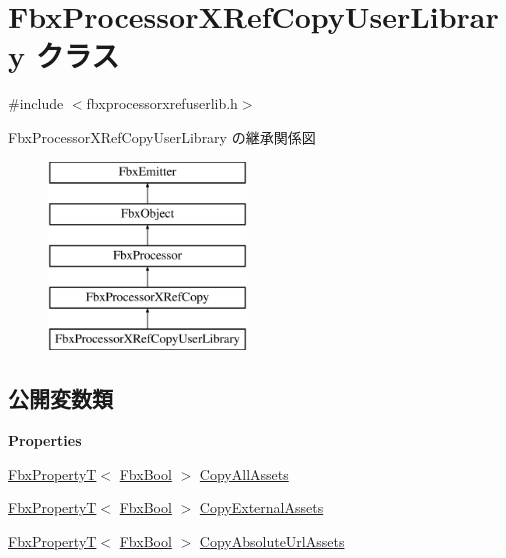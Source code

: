 \hypertarget{class_fbx_processor_x_ref_copy_user_library}{}\section{Fbx\+Processor\+X\+Ref\+Copy\+User\+Library クラス}
\label{class_fbx_processor_x_ref_copy_user_library}


{\ttfamily \#include $<$fbxprocessorxrefuserlib.\+h$>$}

Fbx\+Processor\+X\+Ref\+Copy\+User\+Library の継承関係図\begin{figure}[H]
\begin{center}
\leavevmode
\includegraphics[height=5.000000cm]{class_fbx_processor_x_ref_copy_user_library}
\end{center}
\end{figure}
\subsection*{公開変数類}
\begin{Indent}\textbf{ Properties}\par
\begin{DoxyCompactItemize}
\item 
\hyperlink{class_fbx_property_t}{Fbx\+PropertyT}$<$ \hyperlink{fbxtypes_8h_a92e0562b2fe33e76a242f498b362262e}{Fbx\+Bool} $>$ \hyperlink{class_fbx_processor_x_ref_copy_user_library_aa10de06980a40ae19f01a4407fbd6b9a}{Copy\+All\+Assets}
\item 
\hyperlink{class_fbx_property_t}{Fbx\+PropertyT}$<$ \hyperlink{fbxtypes_8h_a92e0562b2fe33e76a242f498b362262e}{Fbx\+Bool} $>$ \hyperlink{class_fbx_processor_x_ref_copy_user_library_a06e90ca77b70e7241dd57981c30c5836}{Copy\+External\+Assets}
\item 
\hyperlink{class_fbx_property_t}{Fbx\+PropertyT}$<$ \hyperlink{fbxtypes_8h_a92e0562b2fe33e76a242f498b362262e}{Fbx\+Bool} $>$ \hyperlink{class_fbx_processor_x_ref_copy_user_library_a8adc7c6c058547ca3ec8ea4e3589f25e}{Copy\+Absolute\+Url\+Assets}
\end{DoxyCompactItemize}
\end{Indent}
